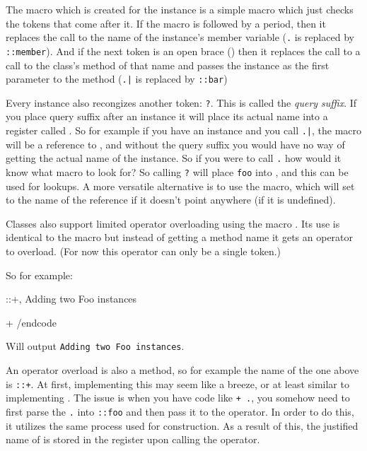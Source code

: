 The macro which is created for the instance is a simple macro which just checks the tokens that come after
it.
If the macro is followed by a period, then it replaces the call to the name of the instance's member variable
({\tt\string\foo.\string\member} is replaced by {\tt\string\foo::member}).
And if the next token is an open brace ({\tt\lbrace}) then it replaces the call to a call to the class's
method of that name and passes the instance as the first parameter to the method
({\tt\string\foo.\string\bar\lbrace\rbrace} is replaced by {\tt\string\Foo::bar\lbrace\string\foo\rbrace})
\endscare

\beginsscare
Every instance also recongizes another token: {\tt?}.
This is called the {\it query suffix}.
If you place query suffix after an instance it will place its actual name into a register called
{\tt\string\tpp@instance@name}.
So for example if you have an instance {\tt\string\foo} and you call {\tt\string\foo.\string\bar}, the macro
{\tt\string\self} will be a reference to {\tt\string\foo}, and without the query suffix you would have no
way of getting the actual name of the instance.
So if you were to call {\tt\string\self.\string\member} how would it know what macro to look for?
So calling {\tt\string\self?} will place {\tt foo} into {\tt\string\tpp@instance@name}, and this can be used
for lookups.
A more versatile alternative is to use the {\tt\string\@get@instance@name} macro, which will set
{\tt\string\tpp@instance@name} to the name of the reference if it doesn't point anywhere (if it is undefined).
\endscare

Classes also support limited operator overloading using the macro {\tt\string\operator}.
Its use is identical to the {\tt\string\method} macro but instead of getting a method name it gets an operator
to overload.
(For now this operator can only be a single token.)

So for example:

\begincode
\operator\Foo::+{\self,\other}{%
    Adding two Foo instances%
}

\Foo\fooA{}
\Foo\fooB{}

\fooA + \fooB
/endcode

Will output {\tt Adding two Foo instances}.

\beginscare
An operator overload is also a method, so for example the name of the one above is {\tt\string\Foo::+}.
At first, implementing this may seem like a breeze, or at least similar to implementing {\tt\string\method}.
The issue is when you have code like {\tt\string\foo + \string\self.\string\foo}, you somehow need to first parse
the {\tt\string\self.\string\foo} into {\tt\string\instance::foo} and then pass it to the operator.
In order to do this, it utilizes the same process used for construction.
As a result of this, the justified name of {\tt\string\other} is stored in the register
{\tt\string\tpp@instance@name} upon calling the operator.
\endscare

